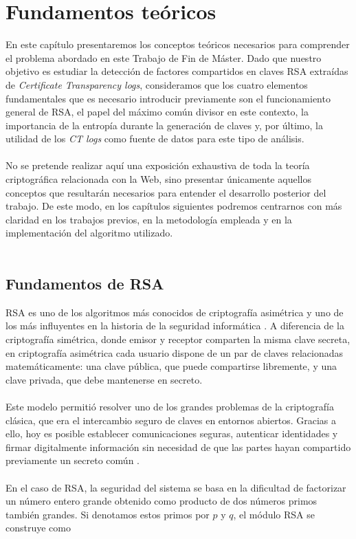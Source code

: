 \chapter{Fundamentos teóricos}

En este capítulo presentaremos los conceptos teóricos necesarios para comprender el problema abordado en este Trabajo de Fin de Máster. Dado que nuestro objetivo es estudiar la detección de factores compartidos en claves RSA extraídas de \textit{Certificate Transparency logs}, consideramos que los cuatro elementos fundamentales que es necesario introducir previamente son el funcionamiento general de RSA, el papel del máximo común divisor en este contexto, la importancia de la entropía durante la generación de claves y, por último, la utilidad de los \textit{CT logs} como fuente de datos para este tipo de análisis.
\\
\\
No se pretende realizar aquí una exposición exhaustiva de toda la teoría criptográfica relacionada con la Web, sino presentar únicamente aquellos conceptos que resultarán necesarios para entender el desarrollo posterior del trabajo. De este modo, en los capítulos siguientes podremos centrarnos con más claridad en los trabajos previos, en la metodología empleada y en la implementación del algoritmo utilizado.
\\
\\

\section{Fundamentos de RSA}

RSA es uno de los algoritmos más conocidos de criptografía asimétrica y uno de los más influyentes en la historia de la seguridad informática \cite{rivest1978method}. A diferencia de la criptografía simétrica, donde emisor y receptor comparten la misma clave secreta, en criptografía asimétrica cada usuario dispone de un par de claves relacionadas matemáticamente: una clave pública, que puede compartirse libremente, y una clave privada, que debe mantenerse en secreto.
\\
\\
Este modelo permitió resolver uno de los grandes problemas de la criptografía clásica, que era el intercambio seguro de claves en entornos abiertos. Gracias a ello, hoy es posible establecer comunicaciones seguras, autenticar identidades y firmar digitalmente información sin necesidad de que las partes hayan compartido previamente un secreto común \cite{rivest1978method}.
\\
\\
En el caso de RSA, la seguridad del sistema se basa en la dificultad de factorizar un número entero grande obtenido como producto de dos números primos también grandes. Si denotamos estos primos por \(p\) y \(q\), el módulo RSA se construye como

